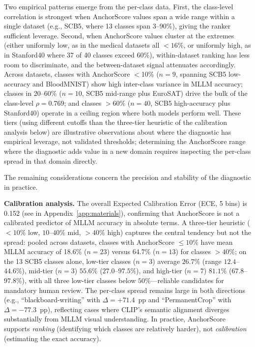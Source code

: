 \documentclass[11pt,a4paper]{article}
\begin{document}
Two empirical patterns emerge from the per-class data. First, the class-level correlation is strongest when AnchorScore values span a wide range within a single dataset (e.g., SCB5, where 13 classes span 3--90\%), giving the ranker sufficient leverage. Second, when AnchorScore values cluster at the extremes (either uniformly low, as in the medical datasets all $<16\%$, or uniformly high, as in Stanford40 where 37 of 40 classes exceed 60\%), within-dataset ranking has less room to discriminate, and the between-dataset signal attenuates accordingly. Across datasets, classes with AnchorScore $<$10\% ($n=9$, spanning SCB5 low-accuracy and BloodMNIST) show high inter-class variance in MLLM accuracy; classes in 20--60\% ($n=10$, SCB5 mid-range plus EuroSAT) drive the bulk of the class-level $\rho=0.769$; and classes $>$60\% ($n=40$, SCB5 high-accuracy plus Stanford40) operate in a ceiling region where both models perform well. These tiers (using different cutoffs than the three-tier heuristic of the calibration analysis below) are illustrative observations about where the diagnostic has empirical leverage, not validated thresholds; determining the AnchorScore range where the diagnostic adds value in a new domain requires inspecting the per-class spread in that domain directly.

The remaining considerations concern the precision and stability of the diagnostic in practice.

\textbf{Calibration analysis.} The overall Expected Calibration Error (ECE, 5 bins) is 0.152 (see  in Appendix~\ref{app:materials}), confirming that AnchorScore is not a calibrated predictor of MLLM accuracy in absolute terms. A three-tier heuristic ($<10\%$ low, $10$--$40\%$ mid, $>40\%$ high) captures the central tendency but not the spread: pooled across datasets, classes with AnchorScore $\leq 10\%$ have mean MLLM accuracy of 18.6\% ($n=23$) versus 64.7\% ($n=13$) for classes $>40\%$; on the 13 SCB5 classes alone, low-tier classes ($n=3$) average $26.7\%$ (range $12.4$--$44.6\%$), mid-tier ($n=3$) $55.6\%$ ($27.0$--$97.5\%$), and high-tier ($n=7$) $81.1\%$ ($67.8$--$97.8\%$), with all three low-tier classes below $50\%$---reliable candidates for mandatory human review. The per-class spread remains large in both directions (e.g., ``blackboard-writing'' with $\Delta=+71.4$~pp and ``PermanentCrop'' with $\Delta=-77.3$~pp), reflecting cases where CLIP's semantic alignment diverges substantially from MLLM visual understanding. In practice, AnchorScore supports \emph{ranking} (identifying which classes are relatively harder), not \emph{calibration} (estimating the exact accuracy).
\end{document}

